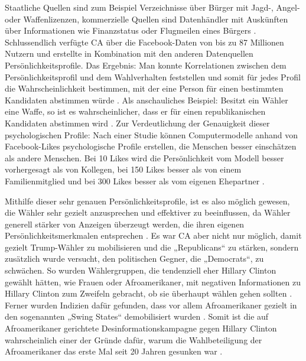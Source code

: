 Staatliche Quellen sind zum Beispiel Verzeichnisse über Bürger mit Jagd-, Angel- oder Waffenlizenzen, kommerzielle Quellen sind Datenhändler mit Auskünften über Informationen wie Finanzstatus oder Flugmeilen eines Bürgers \autocite[vgl.][120,121,122]{wylie2019mindf}.  
Schlussendlich verfügte CA über die Facebook-Daten von bis zu 87 Millionen Nutzern \autocite[vgl.][34]{wylie2019mindf}\autocite[vgl.][]{BBC87Million} und erstellte in Kombination mit den anderen Datenquellen Persönlichkeitsprofile. Das Ergebnis: Man konnte Korrelationen zwischen dem Persönlichkeitsprofil und dem Wahlverhalten feststellen und somit für jedes Profil die Wahrscheinlichkeit bestimmen, mit der eine Person für einen bestimmten Kandidaten abstimmen würde \autocite[vgl.][42]{wylie2019mindf}. Als anschauliches Beispiel: Besitzt ein Wähler eine Waffe, so ist es wahrscheinlicher, dass er für einen republikanischen Kandidaten abstimmen wird \autocite[vgl.][]{StatistaGun}. Zur Verdeutlichung der Genauigkeit dieser psychologischen Profile: Nach einer Studie können Computermodelle anhand von Facebook-Likes psychologische Profile erstellen, die Menschen besser einschätzen als andere Menschen. Bei 10 Likes wird die Persönlichkeit vom Modell besser vorhergesagt als von Kollegen, bei 150 Likes besser als von einem Familienmitglied und bei 300 Likes besser als vom eigenen Ehepartner \autocite[vgl.][]{PersonalityJudgements}. 

Mithilfe dieser sehr genauen Persönlichkeitsprofile, ist es also möglich gewesen, die Wähler sehr gezielt anzusprechen und effektiver zu beeinflussen, da Wähler generell stärker von Anzeigen überzeugt werden, die ihren eigenen Persönlichkeitsmerkmalen entsprechen \autocite[vgl.][]{zarouali2020using}. 
Es war CA aber nicht nur möglich, damit gezielt Trump-Wähler zu mobilisieren und die „Republicans“ zu stärken, sondern zusätzlich wurde versucht, den politischen Gegner, die „Democrats“, zu schwächen. So wurden Wählergruppen, die tendenziell eher Hillary Clinton gewählt hätten, wie Frauen oder Afroamerikaner, mit negativen Informationen zu Hillary Clinton zum Zweifeln gebracht, ob sie überhaupt wählen gehen sollten \autocite[vgl.][]{MicrotargetingBPB}\autocite[vgl.][232,233]{wylie2019mindf}. Ferner wurden Indizien dafür gefunden, dass vor allem Afroamerikaner gezielt in den sogenannten „Swing States“ demobilisiert wurden \autocite[vgl.][]{2016AfroVotesGuardian}. Somit ist die auf Afroamerikaner gerichtete Desinformationskampagne gegen Hillary Clinton wahrscheinlich einer der Gründe dafür, warum die Wahlbeteiligung der Afroamerikaner das erste Mal seit 20 Jahren gesunken war \autocite[vgl.][]{2016AfroVotesGuardian}\autocite[vgl.][]{2016AfroVotesPewResearch}. 

